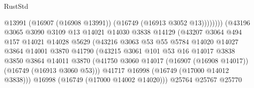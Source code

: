 \begin{lexlean}{RustStd}
\begin{coremodule}
                                              @13991
                                              (@16907 (@16908 @13991))
                                              (@16749 (@16913 @3052 @13))))))))
                                  (@43196
                                    @3065
                                    @3090
                                    @3109
                                    @13
                                    @14021
                                    @14030
                                    @3838
                                    @14129
                                    (@43207
                                      @3064
                                      @494
                                      @157
                                      @14021
                                      @14028
                                      @5629
                                      (@43216
                                        @3063
                                        @53
                                        @55
                                        @5784
                                        @14020
                                        @14027
                                        @3864
                                        @14001
                                        @3870
                                        @41790
                                        (@43215
                                          @3061
                                          @101
                                          @53
                                          @16
                                          @14017
                                          @3838
                                          @3850
                                          @3864
                                          @14011
                                          @3870
                                          (@41750
                                            @3060
                                            @14017
                                            (@16907 (@16908 @14017))
                                            (@16749 (@16913 @3060 @53)))
                                          @41717
                                          @16998
                                          (@16749 (@17000 @14012 @3838)))
                                        @16998
                                        (@16749 (@17000 @14002 @14020)))
                                      @25764
                                      @25767
                                      @25770

\end{coremodule}
\end{lexlean}
